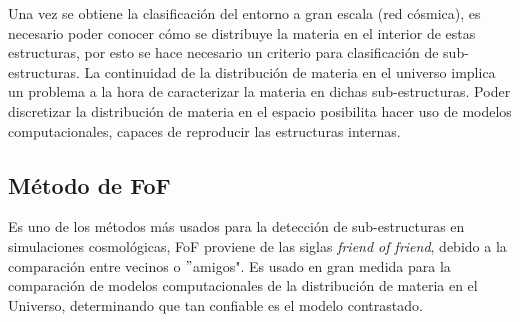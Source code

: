 Una vez se obtiene la clasificación del entorno a gran escala (red cósmica), es necesario poder conocer cómo se distribuye la materia en el interior de estas estructuras, por esto se hace necesario un criterio para clasificación de sub-estructuras. La continuidad de la distribución de materia en el universo implica un  problema a la hora de caracterizar la materia en dichas sub-estructuras. Poder discretizar la distribución de materia en el espacio posibilita hacer uso de modelos computacionales, capaces de reproducir las estructuras internas.

    \subsection{Método de FoF}
    \label{subsec: FoF}

Es uno de los métodos más usados para la detección de sub-estructuras en simulaciones cosmológicas, FoF proviene de las siglas {\it{friend of friend}}, debido a la comparación entre vecinos o $"$amigos". Es usado en gran medida para la comparación de modelos computacionales de la distribución de materia en el Universo,  determinando que tan confiable es el modelo contrastado. 

